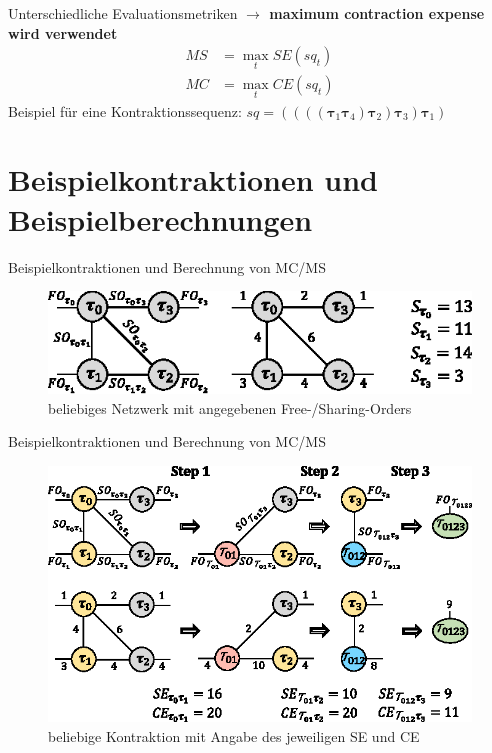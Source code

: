 \documentclass{beamer}
\begin{document}
		\begin{frame}{Unterschiedliche Evaluationsmetriken}
			\textbf{$\rightarrow$ maximum contraction expense wird verwendet}
			\begin{align*}
				MS &= \max_t SE(sq_t)\\ MC &= \max_t CE(sq_t)
			\end{align*}
			Beispiel für eine Kontraktionssequenz:
			$sq = ((((\bm{\tau}_{1} \bm{\tau}_{4}) \bm{\tau}_{2}) \bm{\tau}_{3}) \bm{\tau}_{1})$
		\end{frame}


	\section{Beispielkontraktionen und Beispielberechnungen}
	
		\begin{frame}{Beispielkontraktionen und Berechnung von MC/MS}
			\begin{figure}
				\includegraphics{figure_03_a}
				\caption*{beliebiges Netzwerk mit angegebenen Free-/Sharing-Orders}
			\end{figure}
		\end{frame}

		\begin{frame}{Beispielkontraktionen und Berechnung von MC/MS}
			\begin{figure}
				\includegraphics{figure_03_b}
				\caption*{beliebige Kontraktion mit Angabe des jeweiligen SE und CE}
			\end{figure}
		\end{frame}
\end{document}
